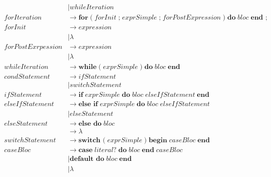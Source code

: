 \documentclass{article}
\begin{document}
\begin{align*}
			&\mid whileIteration \\
		forIteration &\rightarrow \textbf{for} \; \textbf{(} \; forInit \; \textbf{;} \; exprSimple \; \textbf{;} \; forPostExpression \; \textbf{)} \; \textbf{do} \; bloc \; \textbf{end ;} \\
		forInit &\rightarrow expression \\
			&\mid \lambda \\
		forPostExrpession &\rightarrow expression \\
			&\mid \lambda \\
		whileIteration &\rightarrow \textbf{while} \; \textbf{(} \; exprSimple \; \textbf{)} \; \textbf{do} \; bloc \; \textbf{end} \\
		condStatement &\rightarrow ifStatement \\
			&\mid switchStatement	 \\
		ifStatement &\rightarrow \textbf{if} \; exprSimple \; \textbf{do} \; bloc \; elseIfStatement \; \textbf{end} \\
		elseIfStatement &\rightarrow \textbf{else if} \; exprSimple \; \textbf{do} \; bloc \; elseIfStatement \\
			&\mid elseStatement \\
		elseStatement &\rightarrow \textbf{else do} \; bloc \\
			&\rightarrow \lambda \\
		switchStatement &\rightarrow \textbf{switch (}  \;  exprSimple \; \textbf{)} \; \textbf{begin} \; caseBloc \; \textbf{end} \\
		caseBloc &\rightarrow \textbf{case} \; literal? \; \textbf{do} \; bloc \; \textbf{end} \; caseBloc \\
			&\mid \textbf{default do} \; bloc \; \textbf{end} \\
			&\mid \lambda
\end{align*}
\end{document}
